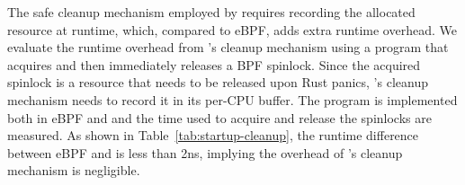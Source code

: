 The safe cleanup mechanism employed by \projname{} requires recording the allocated
    resource at runtime, which, compared to eBPF, adds
    extra runtime overhead.
We evaluate the runtime overhead from \projname{}'s cleanup
    mechanism using a program that acquires and then
    immediately releases a BPF spinlock.
Since the acquired spinlock is a resource that needs to be released upon Rust
    panics, \projname{}'s cleanup mechanism needs to record it in its per-CPU
    buffer.
The program is implemented both in eBPF and \projname{} and the time used to
    acquire and release the spinlocks are measured.
As shown in Table~\ref{tab:startup-cleanup}, the runtime difference between
    eBPF and \projname{} is less than 2ns,
    implying the overhead of \projname{}'s cleanup mechanism is
    negligible.

